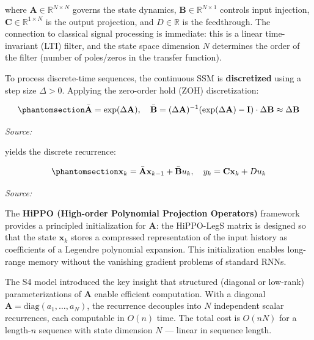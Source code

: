 where \(\mathbf{A} \in \mathbb{R}^{N \times N}\) governs the state dynamics, \(\mathbf{B} \in \mathbb{R}^{N \times 1}\) controls input injection, \(\mathbf{C} \in \mathbb{R}^{1 \times N}\) is the output projection, and \(D \in \mathbb{R}\) is the feedthrough. The connection to classical signal processing is immediate: this is a linear time-invariant (LTI) filter, and the state space dimension \(N\) determines the order of the filter (number of poles/zeros in the transfer function).

To process discrete-time sequences, the continuous SSM is \textbf{discretized} using a step size \(\Delta > 0\). Applying the zero-order hold (ZOH) discretization:

\begin{equation}\protect\phantomsection\label{eq:ssm-zoh}{\bar{\mathbf{A}} = \exp(\Delta \mathbf{A}), \quad \bar{\mathbf{B}} = (\Delta \mathbf{A})^{-1}(\exp(\Delta \mathbf{A}) - \mathbf{I}) \cdot \Delta \mathbf{B} \approx \Delta \mathbf{B}
}\end{equation} \par{\small\textit{Source: \cite{gu2022efficiently}}}

yields the discrete recurrence:

\begin{equation}\protect\phantomsection\label{eq:ssm-discrete}{\mathbf{x}_k = \bar{\mathbf{A}} \mathbf{x}_{k-1} + \bar{\mathbf{B}} u_k, \quad y_k = \mathbf{C} \mathbf{x}_k + D u_k
}\end{equation} \par{\small\textit{Source: \cite{gu2022efficiently}}}

The \textbf{HiPPO (High-order Polynomial Projection Operators)} framework provides a principled initialization for \(\mathbf{A}\): the HiPPO-LegS matrix is designed so that the state \(\mathbf{x}_k\) stores a compressed representation of the input history as coefficients of a Legendre polynomial expansion. This initialization enables long-range memory without the vanishing gradient problems of standard RNNs.

The S4 model \cite{gu2022efficiently} introduced the key insight that structured (diagonal or low-rank) parameterizations of \(\mathbf{A}\) enable efficient computation. With a diagonal \(\mathbf{A} = \text{diag}(a_1, \dots, a_N)\), the recurrence decouples into \(N\) independent scalar recurrences, each computable in \(O(n)\) time. The total cost is \(O(nN)\) for a length-\(n\) sequence with state dimension \(N\) --- linear in sequence length.

